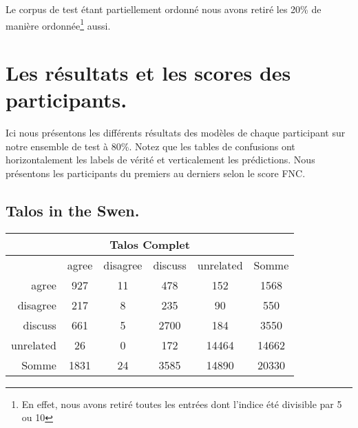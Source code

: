 \documentclass[onecolumn, 12pt]{article}
\begin{document}
Le corpus de test étant partiellement ordonné nous avons retiré les 20\% de manière ordonnée\footnote{En effet, nous avons retiré toutes les entrées dont l'indice été divisible par 5 ou 10} aussi.

\section{Les résultats et les scores des participants.}
Ici nous présentons les différents résultats des modèles de chaque participant sur notre ensemble de test à 80\%.
Notez que les tables de confusions ont horizontalement les labels de vérité et verticalement les prédictions.
Nous présentons les participants du premiers au derniers selon le score FNC.
\subsection{Talos in the Swen.}
\begin{center}
 \begin{tabular}{ r | c c c c | c }
  \multicolumn{6}{c}{Talos Complet}                          \\
  \hline
            & agree & disagree & discuss & unrelated & Somme \\
  \hline
  agree     & 927   & 11       & 478     & 152       & 1568  \\
  disagree  & 217   & 8        & 235     & 90        & 550   \\
  discuss   & 661   & 5        & 2700    & 184       & 3550  \\
  unrelated & 26    & 0        & 172     & 14464     & 14662 \\
  \hline
  Somme     & 1831  & 24       & 3585    & 14890     & 20330 \\
 \end{tabular}
\end{center}
\end{document}

